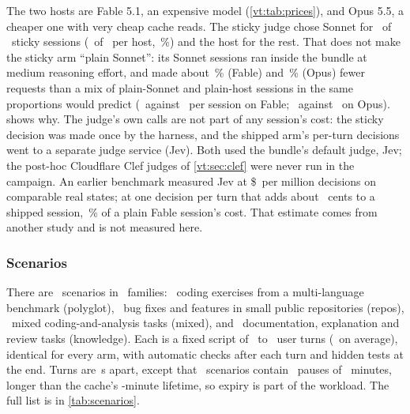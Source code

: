 \begin{table}[!hb]
\centering\small
\caption{Main-loop requests by host, arm, model and reasoning effort (``unset'' is the provider default).}
\label{vt:tab:effortmix}

\end{table}

The two hosts are Fable 5.1, an expensive model (\cref{vt:tab:prices}), and Opus 5.5, a cheaper one with very
cheap cache reads. The sticky judge chose Sonnet for
\NStickySonnetOnly\ of \NStickySessions\ sticky sessions (\StickyCheap\ of \StickyDecisions\ per host,
\StickyCheapPct\,\%) and the host for the rest. That does not make the sticky arm ``plain Sonnet'': its Sonnet
sessions ran inside the bundle at medium reasoning effort, and made about \RvReqGapFable\,\% (Fable) and
\RvReqGapOpus\,\% (Opus) fewer requests than a mix of plain-Sonnet and plain-host sessions in the same proportions
would predict (\RvReqActFable\ against \RvReqPredFable\ per session on Fable; \RvReqActOpus\ against \RvReqPredOpus\ on
Opus).  shows why. The judge's own calls are not part of any session's cost: the sticky decision was made once by the
harness, and the shipped arm's per-turn decisions went to a separate judge service (Jev). Both used the bundle's
default judge, Jev; the post-hoc Cloudflare Clef judges of \cref{vt:sec:clef} were never run in the campaign. An earlier benchmark
measured Jev at \$\JevPerMillion\ per million decisions on comparable real states; at one decision per turn
that adds about \JudgeShippedCents\ cents to a shipped session, \JudgeShippedShare\,\% of a plain Fable
session's cost. That estimate comes from another study and is not measured here.

\subsubsection{Scenarios}

There are \NScenarios\ scenarios in \NFamilies\ families: \FamPolyglot\ coding exercises from a
multi-language benchmark (polyglot), \FamRepos\ bug fixes and features in small public repositories
(repos), \FamMixed\ mixed coding-and-analysis tasks (mixed), and \FamKnowledge\ documentation, explanation
and review tasks (knowledge). Each is a fixed script of \MinTurns\ to \MaxTurns\ user turns (\MeanTurns\ on
average), identical for every arm, with automatic checks after each turn and hidden tests at the end.
Turns are \ShortGapS\,s apart, except that \NLongGapScen\ scenarios contain \LongGapsPerScen\ pauses of
\LongGapMin\ minutes, longer than the cache's \CacheTTLMin-minute lifetime, so expiry is part of the
workload. The full list is in \cref{tab:scenarios}.

